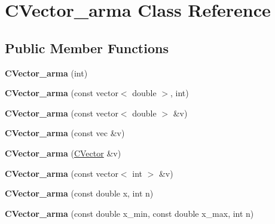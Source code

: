 \hypertarget{class_c_vector__arma}{}\section{C\+Vector\+\_\+arma Class Reference}
\label{class_c_vector__arma}
\subsection*{Public Member Functions}
\begin{DoxyCompactItemize}
\item 
\mbox{\label{class_c_vector__arma_a6f230fb9f2ffefe56cb4da7c9cfec93b}} 
{\bfseries C\+Vector\+\_\+arma} (int)
\item 
\mbox{\label{class_c_vector__arma_a74b4e37ba6ba97d0dc07f9edd83a921d}} 
{\bfseries C\+Vector\+\_\+arma} (const vector$<$ double $>$, int)
\item 
\mbox{\label{class_c_vector__arma_ab4aee4f67b19342d10d8c0f1e22b52c1}} 
{\bfseries C\+Vector\+\_\+arma} (const vector$<$ double $>$ \&v)
\item 
\mbox{\label{class_c_vector__arma_a8afc22589353a64610679346d35a780f}} 
{\bfseries C\+Vector\+\_\+arma} (const vec \&v)
\item 
\mbox{\label{class_c_vector__arma_a1dfc2da9811165ca7701fd2913b7e8d7}} 
{\bfseries C\+Vector\+\_\+arma} (\hyperlink{class_c_vector}{C\+Vector} \&v)
\item 
\mbox{\label{class_c_vector__arma_af318441fc28a93779df15fbe3ae1615f}} 
{\bfseries C\+Vector\+\_\+arma} (const vector$<$ int $>$ \&v)
\item 
\mbox{\label{class_c_vector__arma_a979006127b71faf9fcb6d2945bcf28e1}} 
{\bfseries C\+Vector\+\_\+arma} (const double x, int n)
\item 
\mbox{\label{class_c_vector__arma_a3ffc14e73d8cb40995fb5ee94bce93a7}} 
{\bfseries C\+Vector\+\_\+arma} (const double x\+\_\+min, const double x\+\_\+max, int n)
\item 

\end{DoxyCompactItemize}
